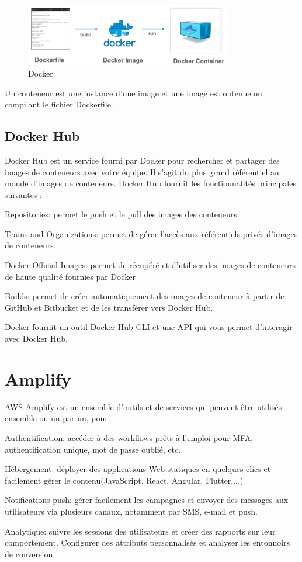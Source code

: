  \begin{figure}[H]
            \centering
                \includegraphics[width=0.8\textwidth]{Figures/dockerfileimagecontainer}
	       \decoRule
		\caption[Docker]{Docker}
	\label{fig:docker}
\end{figure}
Un conteneur est une instance d'une image et une image est obtenue on compilant le fichier Dockerfile.
\subsection{Docker Hub}
Docker Hub est un service fourni par Docker pour rechercher et partager des images de conteneurs avec votre équipe. 
Il s'agit du plus grand référentiel au monde d'images de conteneurs.
Docker Hub fournit les fonctionnalités principales suivantes :
\begin{list}{•}
	\item Repositories: permet le push et le pull des images des conteneurs
	\item Teams and  Organizations: permet de gérer l'accès aux référentiels privés d'images de conteneurs
	\item Docker Official Images: permet de récupéré  et d'utiliser des images de conteneurs de haute qualité fournies par Docker
	\item Builds: permet de créer automatiquement des images de conteneur à partir de GitHub et Bitbucket et de les transférer vers Docker Hub.
\end{list}
Docker fournit un outil  Docker Hub CLI  et une API qui vous permet d'interagir avec Docker Hub.


\section{Amplify}

AWS Amplify est un ensemble d’outils et de services qui peuvent être utilisés ensemble ou un par un, pour:
\begin{list}{•}
\item Authentification: accéder à des workflows prêts à l'emploi pour MFA, authentification unique, mot de passe oublié, etc.
\item Hébergement: déployer des applications Web statiques en quelques clics et facilement gérer le contenu(JavaScript, React, Angular, Flutter,...)
\item Notifications push: gérer facilement les campagnes et envoyer des messages aux utilisateurs via plusieurs canaux, notamment par SMS, e-mail et push.
\item Analytique: suivre les sessions des utilisateurs et créer des rapports sur leur comportement. Configurer des attributs personnalisés et analyser les entonnoirs de conversion.
\end{list}

